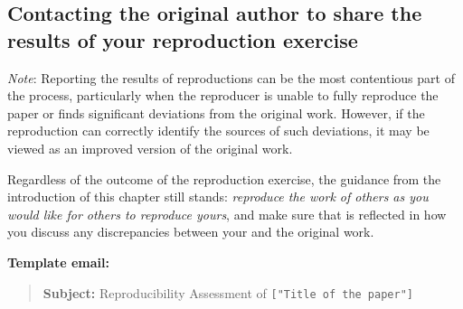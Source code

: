 \documentclass[
]{book}
\begin{document}
\hypertarget{contacting-the-original-author-to-share-the-results-of-your-reproduction-exercise}{%
\subsection{Contacting the original author to share the results of your reproduction exercise}\label{contacting-the-original-author-to-share-the-results-of-your-reproduction-exercise}}

\emph{Note}: Reporting the results of reproductions can be the most contentious part of the process, particularly when the reproducer is unable to fully reproduce the paper or finds significant deviations from the original work. However, if the reproduction can correctly identify the sources of such deviations, it may be viewed as an improved version of the original work.

Regardless of the outcome of the reproduction exercise, the guidance from the introduction of this chapter still stands: \emph{reproduce the work of others as you would like for others to reproduce yours}, and make sure that is reflected in how you discuss any discrepancies between your and the original work.

\textbf{Template email:}

\begin{quote}
\textbf{Subject:} Reproducibility Assessment of \texttt{{[}"Title\ of\ the\ paper"{]}}
\end{quote}
\end{document}
